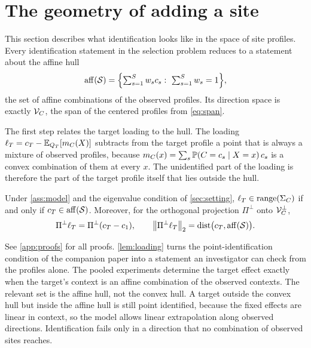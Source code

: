 \section{The geometry of adding a site}
\label{sec:geometry}

This section describes what identification looks like in the space of
site profiles. Every identification statement in the
selection problem reduces to a statement about the affine hull
\begin{equation}
  \operatorname{aff}(\mathcal S)
  =\Bigl\{\textstyle\sum_{s=1}^S w_s c_s:\ \sum_{s=1}^S w_s=1\Bigr\},
  \label{eq:affine-hull}
\end{equation}
the set of affine combinations of the observed profiles. Its direction
space is exactly $\mathcal V_C$, the span of the centered profiles from
\eqref{eq:span}.

The first step relates the target loading to the hull. The loading
$\ell_T=c_T-\mathbb{E}_{Q_T}[m_C(X)]$ subtracts from the target profile a
point that is always a mixture of observed profiles, because
$m_C(x)=\sum_s \mathbb{P}(C=c_s\mid X=x)\,c_s$ is a convex combination of them
at every $x$. The unidentified part of the loading is therefore the part of the target
profile itself that lies outside the hull.

\begin{lemma}
\label{lem:loading}
Under \cref{ass:model} and the eigenvalue condition of
\cref{sec:setting}, $\ell_T\in\operatorname{range}(\Sigma_C)$ if and only if
$c_T\in\operatorname{aff}(\mathcal S)$. Moreover, for the orthogonal projection
$\Pi^\perp$ onto $\mathcal V_C^\perp$,
\begin{equation}
  \Pi^\perp\ell_T=\Pi^\perp(c_T-c_1),
  \qquad
  \left\|{\Pi^\perp\ell_T}\right\|_2=\operatorname{dist}\bigl(c_T,\operatorname{aff}(\mathcal S)\bigr).
  \label{eq:loading-distance}
\end{equation}
\end{lemma}

\noindent
See \cref{app:proofs} for all proofs. \cref{lem:loading} turns the point-identification condition of the
companion paper into a statement an investigator can check from the
profiles alone. The pooled experiments determine the target effect
exactly when the target's context is an affine combination of the
observed contexts. The relevant set is the affine hull, not the convex
hull. A target outside the convex hull but inside the affine hull is
still point identified, because the fixed effects are linear in context,
so the model allows linear extrapolation along observed directions.
Identification fails only in a direction that no combination of observed
sites reaches.


